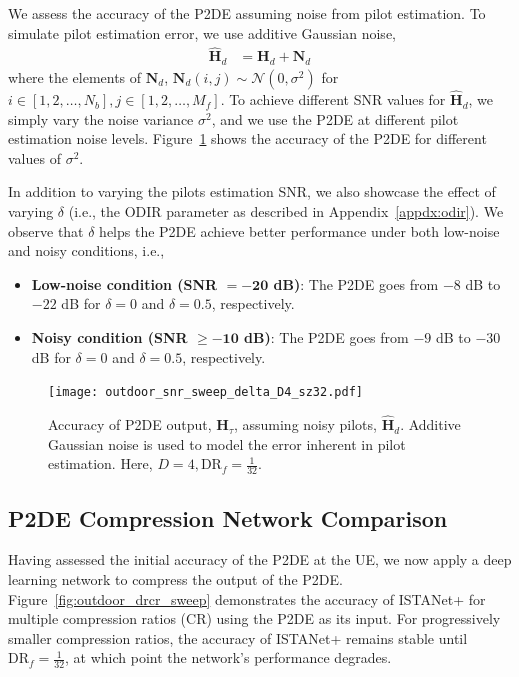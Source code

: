 We assess the accuracy of the P2DE assuming noise from pilot estimation. To simulate pilot estimation error, we use additive Gaussian noise,
\begin{align*}
    \hat{\mathbf{H}}_d &= \mathbf{H}_d + \mathbf{N}_d
\end{align*}
where the elements of $\mathbf{N}_d$, $\mathbf{N}_d(i,j) \sim \mathcal{N}(0, \sigma^2)$ for $i \in \left[1,2,\dots, N_b\right], j \in \left[1,2,\dots, M_f\right]$. To achieve different SNR values for $\hat{\mathbf{H}}_d$, we simply vary the noise variance $\sigma^2$, and we use the P2DE at different pilot estimation noise levels. Figure~\ref{fig:snr_sweep} shows the accuracy of the P2DE for different values of $\sigma^2$.

In addition to varying the pilots estimation SNR, we also showcase the effect of varying $\delta$ (i.e., the ODIR parameter as described in Appendix~\ref{appdx:odir}). We observe that $\delta$ helps the P2DE achieve better performance under both low-noise and noisy conditions, i.e.,

\begin{itemize}
    \item \textbf{Low-noise condition (SNR $\mathbf{=-20}$ dB)}: The P2DE goes from $-8$ dB to $-22$ dB for $\delta=0$ and $\delta=0.5$, respectively.
    \item \textbf{Noisy condition (SNR $\mathbf{\geq -10}$ dB)}: The P2DE goes from $-9$ dB to $-30$ dB for $\delta=0$ and $\delta=0.5$, respectively.
\end{itemize}

\begin{figure}[!hbtp]
    \centering
    \texttt{[image: outdoor\_snr\_sweep\_delta\_D4\_sz32.pdf]}
    \caption{Accuracy of P2DE output, $\mathbf{H}_{\tau}$, assuming noisy pilots, $\hat{\mathbf{H}}_d$. Additive Gaussian noise is used to model the error inherent in pilot estimation. Here, $D=4, \text{DR}_f=\frac{1}{32}$.}
    \label{fig:snr_sweep}
\end{figure}

\subsection{P2DE Compression Network Comparison}

Having assessed the initial accuracy of the P2DE at the UE, we now apply a deep learning network to compress the output of the P2DE. Figure~\ref{fig:outdoor_drcr_sweep} demonstrates the accuracy of ISTANet+ \cite{ref:zhang2018ista} for multiple compression ratios (CR) using the P2DE as its input. For progressively smaller compression ratios, the accuracy of ISTANet+ remains stable until $\text{DR}_f=\frac{1}{32}$, at which point the network's performance degrades.

